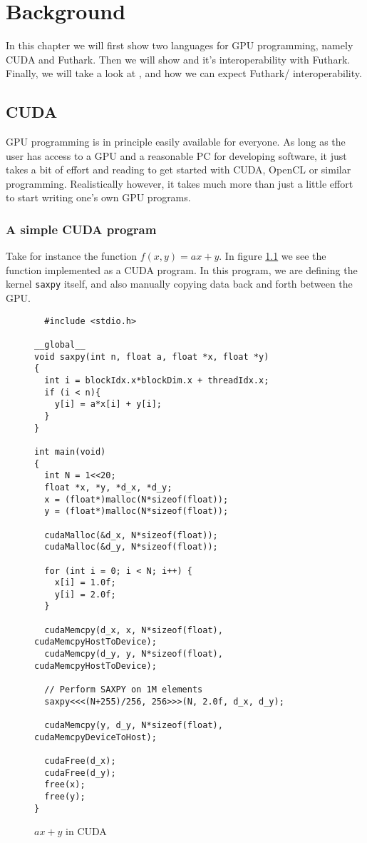 \chapter{Background}
In this chapter we will first show two languages for GPU programming, namely
CUDA and Futhark. Then we will show \csharp{} and it's interoperability with
Futhark.
Finally, we will take a look at \fsharp{}, and how we can expect
Futhark/\fsharp{} interoperability.

\section{CUDA}
GPU programming is in principle easily available for everyone. As long as the user has access
to a GPU and a reasonable PC for developing software, it just takes a bit of effort and reading to get started with CUDA, OpenCL or similar programming.
Realistically however, it takes much more than just a little effort to start
writing one's own GPU programs. 

\subsection{A simple CUDA program}
Take for instance the function $f(x,y) = ax+y$. In figure \ref{fig:cudasaxpy} we see the
function implemented as a CUDA program. In this program, we are defining the
kernel \texttt{saxpy} itself, and also manually copying data back and forth
between the GPU.

\begin{figure}[H]
  \centering
\begin{verbatim}
  #include <stdio.h>

__global__
void saxpy(int n, float a, float *x, float *y)
{
  int i = blockIdx.x*blockDim.x + threadIdx.x;
  if (i < n){
    y[i] = a*x[i] + y[i];
  }
}

int main(void)
{
  int N = 1<<20;
  float *x, *y, *d_x, *d_y;
  x = (float*)malloc(N*sizeof(float));
  y = (float*)malloc(N*sizeof(float));

  cudaMalloc(&d_x, N*sizeof(float)); 
  cudaMalloc(&d_y, N*sizeof(float));

  for (int i = 0; i < N; i++) {
    x[i] = 1.0f;
    y[i] = 2.0f;
  }

  cudaMemcpy(d_x, x, N*sizeof(float), cudaMemcpyHostToDevice);
  cudaMemcpy(d_y, y, N*sizeof(float), cudaMemcpyHostToDevice);

  // Perform SAXPY on 1M elements
  saxpy<<<(N+255)/256, 256>>>(N, 2.0f, d_x, d_y);

  cudaMemcpy(y, d_y, N*sizeof(float), cudaMemcpyDeviceToHost);

  cudaFree(d_x);
  cudaFree(d_y);
  free(x);
  free(y);
}
\end{verbatim}
  \caption{$ax + y$ in CUDA}
  \label{fig:cudasaxpy}
\end{figure}

